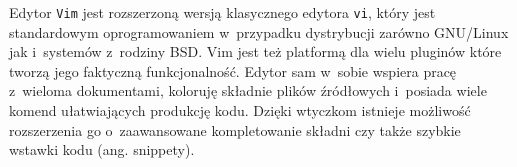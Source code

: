 \par
Edytor \texttt{Vim} jest rozszerzoną wersją klasycznego edytora \texttt{vi}, który jest standardowym oprogramowaniem w~przypadku dystrybucji zarówno GNU/Linux jak i~systemów z~rodziny BSD. Vim jest też platformą dla wielu pluginów które tworzą jego faktyczną funkcjonalność. Edytor sam w~sobie wspiera pracę z~wieloma dokumentami, koloruję składnie plików źródłowych i~posiada wiele komend ułatwiających produkcję kodu. Dzięki wtyczkom istnieje możliwość rozszerzenia go o~zaawansowane kompletowanie składni czy także szybkie wstawki kodu (ang. snippety).

\clearpage

